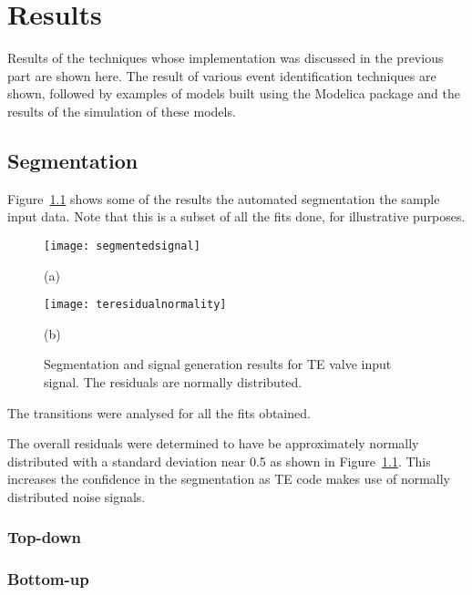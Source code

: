 \chapter{Results}\label{chap:results}
\begin{overview}
  Results of the techniques whose implementation was discussed in the previous part are shown here.  
  The result of various event identification techniques are shown, followed by examples of models built using the Modelica package and the results of the simulation of these models.
\end{overview}

\section{Segmentation}\label{sec:res:segmentation}
Figure~\ref{fig:segmentationresults} shows some of the results the automated segmentation the sample input data.  
Note that this is a subset of all the fits done, for illustrative purposes.  

\begin{figure}[htbp]
  \centering
  \texttt{[image: segmentedsignal]}
  
(a)

  \texttt{[image: teresidualnormality]}

(b)

  \caption{Segmentation and signal generation results for TE valve input signal.  The residuals are normally distributed.}
  \label{fig:segmentationresults}
\end{figure}

The transitions were analysed for all the fits obtained.

The overall residuals were determined to have be approximately
normally distributed with a standard deviation near 0.5 as shown in Figure~\ref{fig:segmentationresults}.  
This increases the confidence in the segmentation as TE code makes use of normally distributed noise signals.

\subsection{Top-down}

\subsection{Bottom-up}


